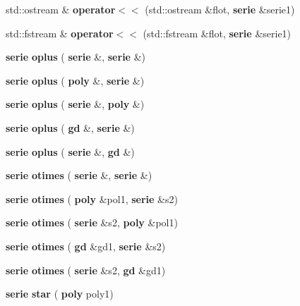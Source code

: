 \begin{DoxyCompactItemize}
\item 
\mbox{\label{classmmgd_1_1serie_ab5c16b5ec4f47cf21bc40d7a8ed334ba}} 
std\+::ostream \& {\bfseries operator$<$$<$} (std\+::ostream \&flot, \textbf{ serie} \&serie1)
\item 
\mbox{\label{classmmgd_1_1serie_aa30553ecd514ac08baab9da517a1634b}} 
std\+::fstream \& {\bfseries operator$<$$<$} (std\+::fstream \&flot, \textbf{ serie} \&serie1)
\item 
\mbox{\label{classmmgd_1_1serie_a5cdfc5f944baf6a0d58154edf0289bd7}} 
\textbf{ serie} {\bfseries oplus} (\textbf{ serie} \&, \textbf{ serie} \&)
\item 
\mbox{\label{classmmgd_1_1serie_a8cefe99b16b97b3b2259c1a7a41bdec2}} 
\textbf{ serie} {\bfseries oplus} (\textbf{ poly} \&, \textbf{ serie} \&)
\item 
\mbox{\label{classmmgd_1_1serie_a785a2830a23c8b9df7fbd48a063d3233}} 
\textbf{ serie} {\bfseries oplus} (\textbf{ serie} \&, \textbf{ poly} \&)
\item 
\mbox{\label{classmmgd_1_1serie_a1e07a6e300fb9cbe0d6852e497b3cf2f}} 
\textbf{ serie} {\bfseries oplus} (\textbf{ gd} \&, \textbf{ serie} \&)
\item 
\mbox{\label{classmmgd_1_1serie_ae3797d1df8139dea71783da93a19db37}} 
\textbf{ serie} {\bfseries oplus} (\textbf{ serie} \&, \textbf{ gd} \&)
\item 
\mbox{\label{classmmgd_1_1serie_aea7881b4435b831b601498506d6f0b81}} 
\textbf{ serie} {\bfseries otimes} (\textbf{ serie} \&, \textbf{ serie} \&)
\item 
\mbox{\label{classmmgd_1_1serie_ac420e254d3fbdecfa4c845352efceae0}} 
\textbf{ serie} {\bfseries otimes} (\textbf{ poly} \&pol1, \textbf{ serie} \&s2)
\item 
\mbox{\label{classmmgd_1_1serie_a2ce30e8ff131fe98008b9e8846518a64}} 
\textbf{ serie} {\bfseries otimes} (\textbf{ serie} \&s2, \textbf{ poly} \&pol1)
\item 
\mbox{\label{classmmgd_1_1serie_a64dd80055a1485aa4188d3e51b65f327}} 
\textbf{ serie} {\bfseries otimes} (\textbf{ gd} \&gd1, \textbf{ serie} \&s2)
\item 
\mbox{\label{classmmgd_1_1serie_adae673cecde6bd03cc153ca190902664}} 
\textbf{ serie} {\bfseries otimes} (\textbf{ serie} \&s2, \textbf{ gd} \&gd1)
\item 
\mbox{\label{classmmgd_1_1serie_ab39087f51b76a3f107d9a9470e53a588}} 
\textbf{ serie} {\bfseries star} (\textbf{ poly} poly1)
\item 

\end{DoxyCompactItemize}
